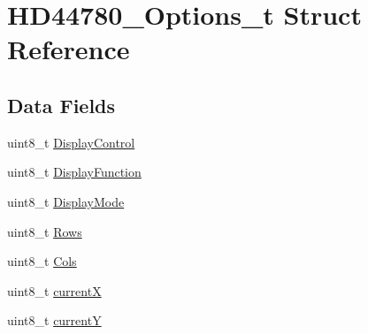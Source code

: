 \hypertarget{struct_h_d44780___options__t}{}\section{H\+D44780\+\_\+\+Options\+\_\+t Struct Reference}
\label{struct_h_d44780___options__t}
\subsection*{Data Fields}
\begin{DoxyCompactItemize}
\item 
uint8\+\_\+t \hyperlink{struct_h_d44780___options__t_aed1944b2c81fcd127027656a1aeb728e}{Display\+Control}
\item 
uint8\+\_\+t \hyperlink{struct_h_d44780___options__t_ae097cb598557255e744da8452e6d7d96}{Display\+Function}
\item 
uint8\+\_\+t \hyperlink{struct_h_d44780___options__t_a1b35879fbf92ef75056a03d7480adeba}{Display\+Mode}
\item 
uint8\+\_\+t \hyperlink{struct_h_d44780___options__t_a68d23667da79372ed89149bf8457caab}{Rows}
\item 
uint8\+\_\+t \hyperlink{struct_h_d44780___options__t_a28905366e0f6914c460923c66bafedcb}{Cols}
\item 
uint8\+\_\+t \hyperlink{struct_h_d44780___options__t_adb9e4eaa0d1e01e293e12f39aa47f321}{currentX}
\item 
uint8\+\_\+t \hyperlink{struct_h_d44780___options__t_ac77fb48e30acdfbf71b6c9967759f034}{currentY}
\end{DoxyCompactItemize}


